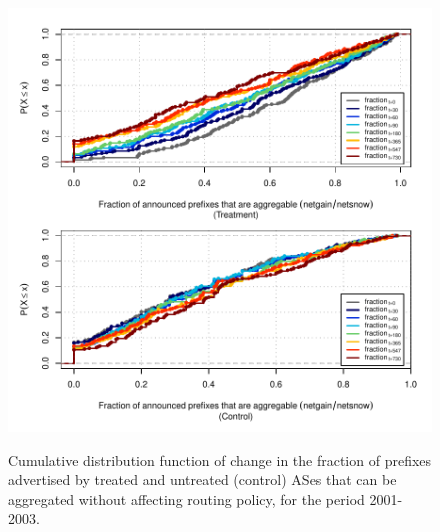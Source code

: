 \clearpage
\vspace*{1.25em}
\begin{figure}[H]
\begin{centering}
\begin{singlespace}
\captionsetup{list=no}
    \includegraphics[width=6in]{figures/behavior-frac_deagg-2001_2003-corr.pdf}
    \vspace{-2em}\\
    \caption{Cumulative distribution function of change in the fraction of
    prefixes advertised by treated and untreated (control) ASes that can be
    aggregated without affecting routing policy, for the period 2001-2003.}
\end{singlespace}
\end{centering}
\end{figure}

